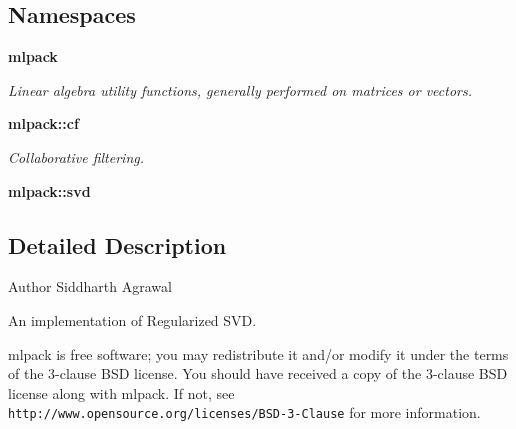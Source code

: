 \subsection*{Namespaces}
\begin{DoxyCompactItemize}
\item 
 {\bf mlpack}
\begin{DoxyCompactList}\small\item\em Linear algebra utility functions, generally performed on matrices or vectors. \end{DoxyCompactList}\item 
 {\bf mlpack\+::cf}
\begin{DoxyCompactList}\small\item\em Collaborative filtering. \end{DoxyCompactList}\item 
 {\bf mlpack\+::svd}
\end{DoxyCompactItemize}


\subsection{Detailed Description}
\begin{DoxyAuthor}{Author}
Siddharth Agrawal
\end{DoxyAuthor}
An implementation of Regularized S\+VD.

mlpack is free software; you may redistribute it and/or modify it under the terms of the 3-\/clause B\+SD license. You should have received a copy of the 3-\/clause B\+SD license along with mlpack. If not, see {\tt http\+://www.\+opensource.\+org/licenses/\+B\+S\+D-\/3-\/\+Clause} for more information. 